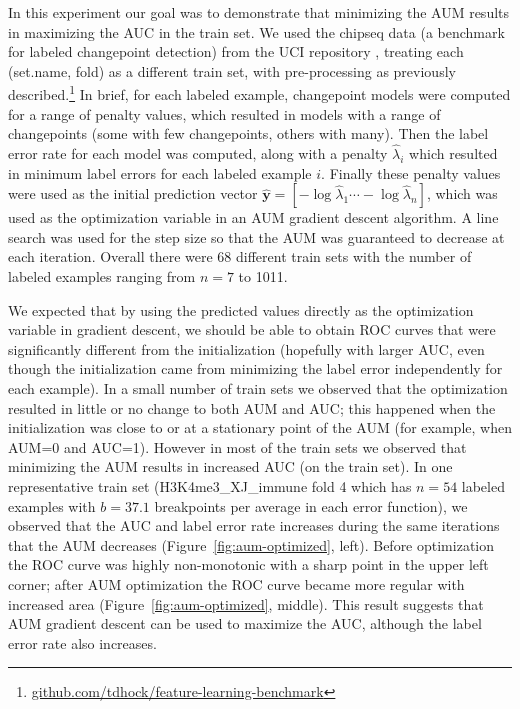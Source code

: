 \documentclass{article}
\begin{document}
In this experiment our goal was to demonstrate that minimizing the AUM results in maximizing the AUC in the train set. 
We used the chipseq data (a benchmark for labeled changepoint detection) from the UCI repository \citep{asuncion2007uci}, treating each (set.name, fold) as a different train set, with pre-processing as previously described.\footnote{
\small \href{https://github.com/tdhock/feature-learning-benchmark}{github.com/tdhock/feature-learning-benchmark}}
In brief, for each labeled example, changepoint models were computed for a range of penalty values, which resulted in models with a range of changepoints (some with few changepoints, others with many).
Then the label error rate for each model was computed, along with a penalty $\hat \lambda_i$ which resulted in minimum label errors for each labeled example $i$.
Finally these penalty values were used as the initial prediction vector $\mathbf{\hat y} = [ -\log\hat\lambda_1 \cdots -\log\hat\lambda_n]$, which was used as the optimization variable in an AUM gradient descent algorithm. 
A line search was used for the step size so that the AUM was guaranteed to decrease at each iteration. 
Overall there were 68 different train sets with the number of labeled examples ranging from $n=7$ to 1011.

We expected that by using the predicted values directly as the optimization variable in gradient descent, we should be able to obtain ROC curves that were significantly different from the initialization (hopefully with larger AUC, even though the initialization came from minimizing the label error independently for each example).
In a small number of train sets we observed that the optimization resulted in little or no change to both AUM and AUC; this happened when the initialization was close to or at a stationary point of the AUM (for example, when AUM=0 and AUC=1).
However in most of the train sets we observed that minimizing the AUM results in increased AUC (on the train set). 
In one representative train set (H3K4me3\_XJ\_immune fold 4 which has $n=54$ labeled examples with $b=37.1$ breakpoints per average in each error function), we observed that the AUC and label error rate increases during the same iterations that the AUM decreases (Figure~\ref{fig:aum-optimized}, left).
Before optimization the ROC curve was highly non-monotonic with a sharp point in the upper left corner; after AUM optimization the ROC curve became more regular with increased area (Figure~\ref{fig:aum-optimized}, middle).
This result suggests that AUM gradient descent can be used to maximize the AUC, although the label error rate also increases.
\end{document}
